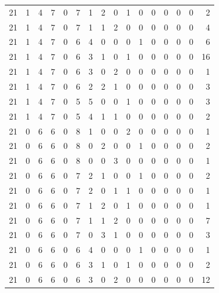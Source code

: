 \begin{appendix}
{\begin{longtable}{lrrrrrrrrrrrrrrr}
    21        & 1  & 4  & 7  & 0  & 7  & 1  & 2  & 0  & 1  & 0  & 0  & 0   & 0   & 0   & 2    \\
    21        & 1  & 4  & 7  & 0  & 7  & 1  & 1  & 2  & 0  & 0  & 0  & 0   & 0   & 0   & 4    \\
    21        & 1  & 4  & 7  & 0  & 6  & 4  & 0  & 0  & 0  & 1  & 0  & 0   & 0   & 0   & 6    \\
    21        & 1  & 4  & 7  & 0  & 6  & 3  & 1  & 0  & 1  & 0  & 0  & 0   & 0   & 0   & 16   \\
    21        & 1  & 4  & 7  & 0  & 6  & 3  & 0  & 2  & 0  & 0  & 0  & 0   & 0   & 0   & 1    \\
    21        & 1  & 4  & 7  & 0  & 6  & 2  & 2  & 1  & 0  & 0  & 0  & 0   & 0   & 0   & 3    \\
    21        & 1  & 4  & 7  & 0  & 5  & 5  & 0  & 0  & 1  & 0  & 0  & 0   & 0   & 0   & 3    \\
    21        & 1  & 4  & 7  & 0  & 5  & 4  & 1  & 1  & 0  & 0  & 0  & 0   & 0   & 0   & 2    \\
    21        & 0  & 6  & 6  & 0  & 8  & 1  & 0  & 0  & 2  & 0  & 0  & 0   & 0   & 0   & 1    \\
    21        & 0  & 6  & 6  & 0  & 8  & 0  & 2  & 0  & 0  & 1  & 0  & 0   & 0   & 0   & 2    \\
    21        & 0  & 6  & 6  & 0  & 8  & 0  & 0  & 3  & 0  & 0  & 0  & 0   & 0   & 0   & 1    \\
    21        & 0  & 6  & 6  & 0  & 7  & 2  & 1  & 0  & 0  & 1  & 0  & 0   & 0   & 0   & 2    \\
    21        & 0  & 6  & 6  & 0  & 7  & 2  & 0  & 1  & 1  & 0  & 0  & 0   & 0   & 0   & 1    \\
    21        & 0  & 6  & 6  & 0  & 7  & 1  & 2  & 0  & 1  & 0  & 0  & 0   & 0   & 0   & 1    \\
    21        & 0  & 6  & 6  & 0  & 7  & 1  & 1  & 2  & 0  & 0  & 0  & 0   & 0   & 0   & 7    \\
    21        & 0  & 6  & 6  & 0  & 7  & 0  & 3  & 1  & 0  & 0  & 0  & 0   & 0   & 0   & 3    \\
    21        & 0  & 6  & 6  & 0  & 6  & 4  & 0  & 0  & 0  & 1  & 0  & 0   & 0   & 0   & 1    \\
    21        & 0  & 6  & 6  & 0  & 6  & 3  & 1  & 0  & 1  & 0  & 0  & 0   & 0   & 0   & 2    \\
    21        & 0  & 6  & 6  & 0  & 6  & 3  & 0  & 2  & 0  & 0  & 0  & 0   & 0   & 0   & 12   \\

\end{longtable}}
\end{appendix}
